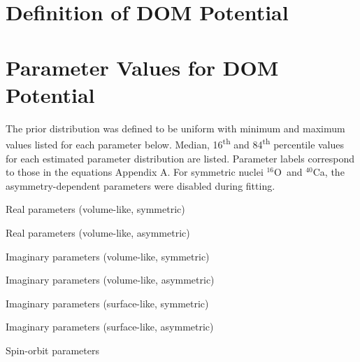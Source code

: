 \documentclass[twocolumn,secnumarabic,amssymb, nobibnotes, aps, prl,
superscriptaddress, nobalancelastpage]{revtex4}
\newcommand{\oSix}{\ensuremath{^{16}}O}
\newcommand{\caForty}{\ensuremath{^{40}}C\lowercase{a}}
\begin{document}
\onecolumngrid
\newpage
\appendix \label{DOMFunctionalForms}
\section{Definition of DOM Potential}

\newpage
\appendix \label{DOMParameterValues}
\section{Parameter Values for DOM Potential}
The prior distribution was defined to be uniform with minimum and maximum values
listed for each parameter below. Median, 16\textsuperscript{th} and
84\textsuperscript{th} percentile values for each estimated parameter
distribution are listed. Parameter labels correspond
to those in the equations Appendix A. For symmetric nuclei \oSix\ and \caForty, the
asymmetry-dependent parameters were disabled during fitting.

\begin{table}[htb]
    \centering
    \caption{Real parameters (volume-like, symmetric)}
    
    \vspace{2em}
    \caption{Real parameters (volume-like, asymmetric)}
    
\end{table}
\begin{table}[htb]
    \centering
    \caption{Imaginary parameters (volume-like, symmetric)}
    \makebox[\textwidth][c]{}
    \vspace{2em}
    \caption{Imaginary parameters (volume-like, asymmetric)}
    \makebox[\textwidth][c]{}
    \vspace{2em}
    \caption{Imaginary parameters (surface-like, symmetric)}
    \makebox[\textwidth][c]{}
\end{table}
\clearpage
\begin{table}[htb]
    \centering
    \caption{Imaginary parameters (surface-like, asymmetric)}
    \makebox[\textwidth][c]{}
    \vspace{2em}
    \caption{Spin-orbit parameters}
    \makebox[\textwidth][c]{}
    \vspace*{4in}
\end{table}
\end{document}

